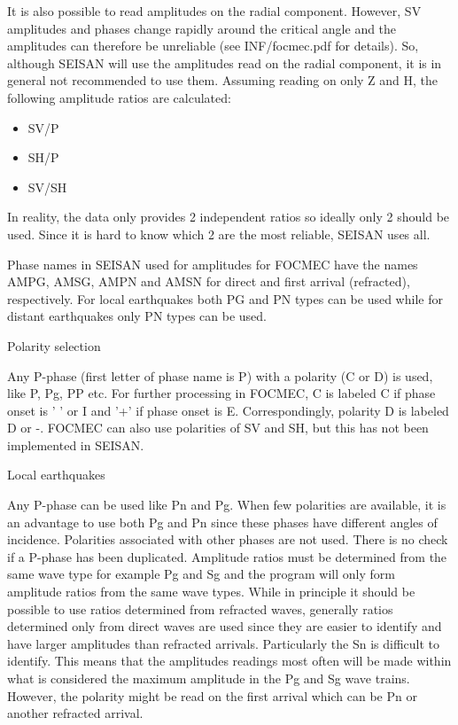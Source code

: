 It is also possible to read amplitudes on the radial component. However, SV amplitudes and phases change rapidly around the critical angle and the amplitudes can therefore be unreliable (see INF/focmec.pdf for details). So, although SEISAN will use the amplitudes read on the radial component, it is in general not recommended to use them. Assuming reading on only Z and H, the following amplitude ratios are calculated:

\begin{itemize}
\item
SV/P
\item
SH/P
\item
SV/SH
\end{itemize}

In reality, the data only provides 2 independent ratios so ideally only 2 should be used. Since it is hard to know which 2 are the most reliable, SEISAN uses all. 

Phase names in SEISAN used for amplitudes for FOCMEC have the names AMPG, AMSG, AMPN and AMSN for direct and first arrival (refracted), respectively. For local earthquakes both PG and PN types can be used while for distant earthquakes only PN types can be used.

Polarity selection

Any P-phase (first letter of phase name is P) with a polarity (C or D) is used, like P, Pg, PP etc. For further processing in FOCMEC, C  is labeled C if phase onset is ' ' or I and '+' if phase onset is E. Correspondingly, polarity D is labeled D or -.   FOCMEC can also use polarities of SV and SH, but this has not been implemented in SEISAN.

Local earthquakes

Any P-phase can be used like Pn and Pg. When few polarities are available, it is an advantage to use both Pg and Pn since these phases have different angles of incidence. Polarities associated with other phases are not used. There is no check if a P-phase has been duplicated. \newline
Amplitude ratios must be determined from the same wave type for example Pg and Sg and the program will only form amplitude ratios from the same wave types.  While in principle it should be possible to use ratios determined from refracted waves, generally ratios determined only from direct waves are used since they are easier to identify and have larger amplitudes than refracted arrivals. Particularly the Sn is difficult to identify. This means that the amplitudes readings most often will be made within what is considered the maximum amplitude in the Pg and Sg wave trains. However, the polarity might be read on the first arrival which can be Pn or another refracted arrival. 

